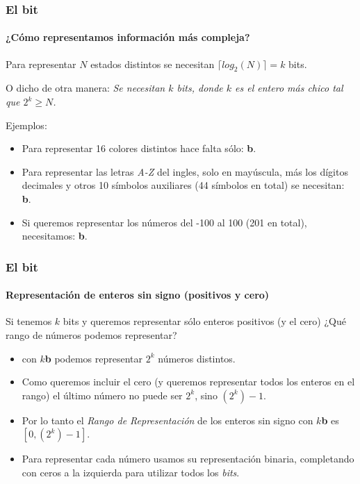 \documentclass[11pt,a4paper,spanish]{beamer}
\newcommand{\bit}{\textbf{b}}
\begin{document}
\begin{frame}

\frametitle{El bit}
\framesubtitle{¿Cómo representamos información más compleja?}

    Para representar $N$ estados distintos se necesitan $\lceil{log_{2}(N)\rceil} =
    k$ bits.
    
    O dicho de otra manera: \emph{Se necesitan $k$ bits, donde $k$ es el
    entero más chico tal que $2^k\ge{}N$.}

    \pause
    Ejemplos:
    \begin{itemize}
        \item Para representar 16 colores distintos hace falta sólo: \bit. \pause
    \item Para representar las letras \emph{A-Z} del ingles, solo en
        mayúscula, más los dígitos decimales y otros 10 símbolos auxiliares
            (44 símbolos en total) se necesitan: \bit. \pause
        \item Si queremos representar los números del -100 al 100 (201 en
            total), necesitamos: \bit.
    \end{itemize}

\end{frame}

\begin{frame}

\frametitle{El bit}
\framesubtitle{Representación de enteros sin signo (positivos y cero)}

    Si tenemos $k$ bits y queremos representar sólo enteros positivos (y el
    cero) ¿Qué rango de números podemos representar?

    \pause
    \begin{itemize}
        \item con $k$\bit{} podemos representar $2^{k}$ números distintos.
            \pause
        \item Como queremos incluir el cero (y queremos representar todos los
            enteros en el rango) el último número no puede ser $2^{k}$, sino
            $(2^{k})-1$. \pause
        \item Por lo tanto el \emph{Rango de Representación} de los enteros
            sin signo con $k$\bit{} es $[0,(2^{k})-1]$.\pause
        \item Para representar cada número usamos su representación binaria,
            completando con ceros a la izquierda para utilizar todos los
            \emph{bits}.
    \end{itemize}
\end{frame}
\end{document}
